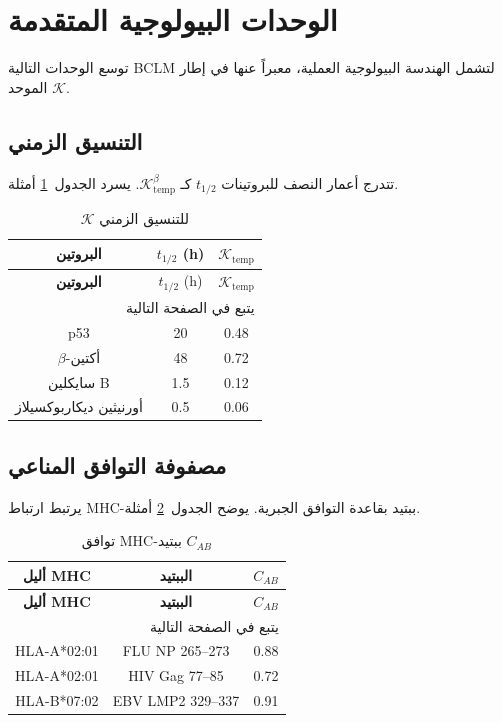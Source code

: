 \documentclass[11pt,a4paper]{article}
\newcommand{\REL}{\mathcal{K}}
\begin{document}
	\section{الوحدات البيولوجية المتقدمة}
	\label{sec:modules}
	توسع الوحدات التالية BCLM لتشمل الهندسة البيولوجية العملية، معبراً عنها في إطار \(\REL\) الموحد.
	
	\subsection{التنسيق الزمني}
	تتدرج أعمار النصف للبروتينات \(t_{1/2}\) كـ \(\REL_{\mathrm{temp}}^{\beta}\). يسرد الجدول~\ref{tab:temporal} أمثلة.
	
	\begin{longtable}{|c|c|c|}
		\caption{\(\REL\) للتنسيق الزمني}\label{tab:temporal}\\
		\hline
		\textbf{البروتين} & \(t_{1/2}\) (h) & \(\REL_{\mathrm{temp}}\) \\
		\hline
		\endfirsthead
		\hline
		\textbf{البروتين} & \(t_{1/2}\) (h) & \(\REL_{\mathrm{temp}}\) \\
		\hline
		\endhead
		\hline
		\multicolumn{3}{r}{يتبع في الصفحة التالية}\\
		\endfoot
		\hline
		\endlastfoot
		p53 & 20 & 0.48 \\
		\(\beta\)-أكتين & 48 & 0.72 \\
		سايكلين B & 1.5 & 0.12 \\
		أورنيثين ديكاربوكسيلاز & 0.5 & 0.06 \\
		\hline
	\end{longtable}
	
	\subsection{مصفوفة التوافق المناعي}
	يرتبط ارتباط MHC-ببتيد بقاعدة التوافق الجبرية. يوضح الجدول~\ref{tab:mhc} أمثلة.
	
	\begin{longtable}{|c|c|c|}
		\caption{توافق MHC-ببتيد \(C_{AB}\)}\label{tab:mhc}\\
		\hline
		\textbf{أليل MHC} & \textbf{الببتيد} & \(C_{AB}\) \\
		\hline
		\endfirsthead
		\hline
		\textbf{أليل MHC} & \textbf{الببتيد} & \(C_{AB}\) \\
		\hline
		\endhead
		\hline
		\multicolumn{3}{r}{يتبع في الصفحة التالية}\\
		\endfoot
		\hline
		\endlastfoot
		HLA-A*02:01 & FLU NP 265–273 & 0.88 \\
		HLA-A*02:01 & HIV Gag 77–85 & 0.72 \\
		HLA-B*07:02 & EBV LMP2 329–337 & 0.91 \\
		\hline
	\end{longtable}
	
\end{document}
